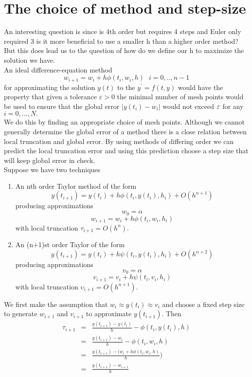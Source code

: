 \section{The choice of method and step-size}
An interesting question is since  is 4th order but requires 4 steps and Euler
only required 3 is it more beneficial to use a smaller h than a higher order method?\\
But this does lead us to the question of how do we define our h to maximize
the solution we have.\\
An ideal difference-equation method
\[w_{i+1}=w_i+h\phi(t_i,w_i,h) \ \ \ i=0,..,n-1 \]
for approximating the solution $y(t)$ to the 
$ y^{'} = f(t,y)$ would have the property that given a tolerance $\varepsilon >0$
the minimal number of mesh points would be used to ensure that the global error
$|y(t_i)-w_i|$ would not exceed $\varepsilon$ for any $i=0,...,N.$\\
We do this by finding an appropriate choice of mesh points. Although we cannot 
generally determine the global error of a method there is a close relation between 
local truncation and global error.  By using methods of differing order we can predict the local truncation error and using this prediction choose a step size
that will keep global error in check.\\
Suppose we have two techniques
\begin{enumerate}
\item
An nth order Taylor method of the form
\[y(t_{i+1}) = y(t_i) +h\phi(t_i,y(t_i),h_i)+O(h^{n+1}) \]
producing approximations
\[w_0=\alpha \]
\[w_{i+1}=w_i +h\phi(t_i,w_i,h_i)\]
with local truncation $\tau_{i+1}=O(h^n).$
\item
An (n+1)st order Taylor of the form
\[y(t_{i+1}) = y(t_i) +h\psi(t_i,y(t_i),h_i)+O(h^{n+2}) \]
producing approximations
\[v_0=\alpha \]
\[v_{i+1}=v_i +h\psi(t_i,v_i,h_i)\]
with local truncation $\upsilon_{i+1}=O(h^{n+1}).$
\end{enumerate}
We first make the assumption that $w_i \approx y(t_i) \approx v_i$ and choose a fixed
step size to generate $w_{i+1}$ and $v_{i+1}$ to approximate $y(t_{i+1})$.  Then
\begin{eqnarray*}
\tau_{i+1} & = & \frac{y(t_{i+1})-y(t_i)}{h} - \phi(t_i,y(t_i),h) \\
& = &  \frac{y(t_{i+1})-w_i}{h} - \phi(t_i,w_i,h) \\
& = &  \frac{y(t_{i+1})-(w_i+h\phi(t_i,w_i,h)}{h}) \\
& = &  \frac{y(t_{i+1})-w_{i+1}}{h} 
\end{eqnarray*}
